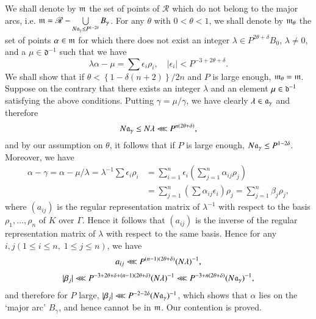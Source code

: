 We shall denote by $\mathfrak{m}$ the set of points of $\mathscr{R}$ which do not belong to the major arcs, i.e. $\mathfrak{m} = \mathscr{R} - \bigcup\limits_{N\mathfrak{a}_\gamma \leq P^{1-2 \delta}} B_\gamma$. For any $\theta$ with $0 < \theta < 1$, we shall denote by $\mathfrak{m}_\theta$ the set of points $\alpha \in \mathfrak{m}$ for which there does not exist an integer $\lambda \in P^{2 \theta + \delta} B_0$, $\lambda \neq 0$, and a $\mu \in \mathfrak{d}^{-1}$ such that we have
$$
\lambda \alpha - \mu = \sum \epsilon_i \rho_i, \quad |\epsilon_i| < P^{-3+2 \theta + \delta}.
$$
We shall show that if $\theta < \left\{1-\delta (n+2) \right\}/ 2 n$  and $P$ is large enough, $\mathfrak{m}_\theta = \mathfrak{m}$. Suppose on the contrary that there exists an integer $\lambda$ and an element $\mu \in \mathfrak{d}^{-1}$ satisfying the above conditions. Putting $\gamma = \mu /\gamma$, we have clearly $\lambda \in \mathfrak{a}_\gamma$ and therefore 
$$
N\mathfrak{a}_\gamma \leq N \lambda \lll P^{n(2\theta + \delta)},
$$
and by our assumption on $\theta$, it follows that if $P$ is large enough, $N\mathfrak{a}_\gamma \leq P^{1-2\delta}$. Moreover, we have
\begin{align*}
\alpha - \gamma = \alpha -\mu /\lambda = \lambda^{-1} \sum \epsilon_i \rho_i
& = \sum\limits^n_{i=1} \epsilon_i \left(\sum\limits^n_{j=1} \alpha_{ij} \rho_j \right)\\
&= \sum\limits^n_{j=1} \left(\sum \alpha_{ij} \epsilon_i\right) \rho_j = \sum\limits^n_{j=1} \beta_j \rho_j,
\end{align*}
where $(a_{ij})$ is the regular representation matrix of $\lambda^{-1}$ with respect to the basis $\rho_1, \ldots, \rho_n$ of $K$ over $\Gamma$. Hence it follows that $(a_{ij})$ is the inverse of the regular representation matrix of $\lambda$ with respect to the same basis. Hence for any $i, j (1 \leq i \leq n, \; 1 \leq j \leq n)$, we have
\begin{gather*}
a_{ij} \lll P^{(n-1)(2\theta + \delta)} (N\lambda)^{-1},\\[3pt]
|\beta_j| \lll P^{-3+2 \theta + \delta + (n-1) (2\theta+\delta)} (N\lambda)^{-1} \lll P^{-3 + n (2\theta+ \delta)} (N\mathfrak{a}_\gamma)^{-1},
\end{gather*}
and therefore for $P$ large, $|\beta_j| \lll P^{-2-2 \delta} (N\mathfrak{a}_\gamma )^{-1}$, which shows that $\alpha$ lies on the `major arc' $B_\gamma$, and hence cannot be in $\mathfrak{m}$. Our contention is proved.

